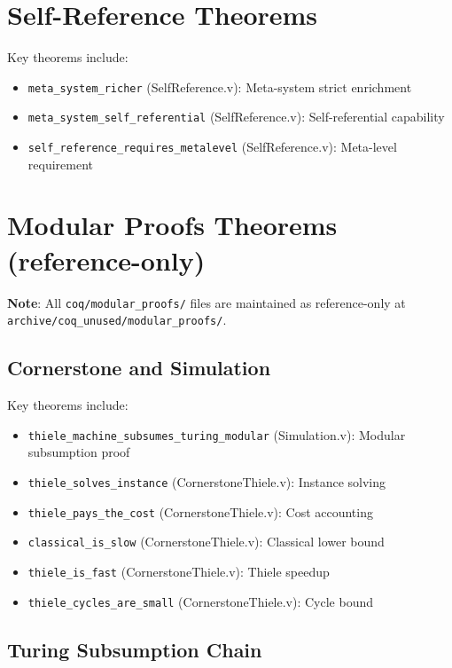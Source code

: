 \section{Self-Reference Theorems}

Key theorems include:
\begin{itemize}
    \item \texttt{meta\_system\_richer} (SelfReference.v): Meta-system strict enrichment
    \item \texttt{meta\_system\_self\_referential} (SelfReference.v): Self-referential capability
    \item \texttt{self\_reference\_requires\_metalevel} (SelfReference.v): Meta-level requirement
\end{itemize}

\section{Modular Proofs Theorems (reference-only)}

\textbf{Note}: All \texttt{coq/modular\_proofs/} files are maintained as reference-only at \texttt{archive/coq\_unused/modular\_proofs/}.

\subsection{Cornerstone and Simulation}

Key theorems include:
\begin{itemize}
    \item \texttt{thiele\_machine\_subsumes\_turing\_modular} (Simulation.v): Modular subsumption proof
    \item \texttt{thiele\_solves\_instance} (CornerstoneThiele.v): Instance solving
    \item \texttt{thiele\_pays\_the\_cost} (CornerstoneThiele.v): Cost accounting
    \item \texttt{classical\_is\_slow} (CornerstoneThiele.v): Classical lower bound
    \item \texttt{thiele\_is\_fast} (CornerstoneThiele.v): Thiele speedup
    \item \texttt{thiele\_cycles\_are\_small} (CornerstoneThiele.v): Cycle bound
\end{itemize}

\subsection{Turing Subsumption Chain}

